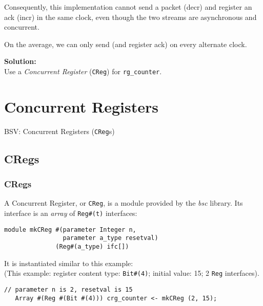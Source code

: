 \begin{frame}[fragile]
\begin{minipage}{0.4\textwidth}
{\scriptsize
Consequently, this implementation cannot send a packet (decr) and
register an ack (incr) in the same clock, even though the two streams
are asynchronous and concurrent.}

\vspace{1ex}

{\scriptsize
On the average, we can only send (and register ack) on every alternate clock.}

\vspace{2ex}

{\bf Solution:} \\
Use a \emph{Concurrent Register} ({\tt CReg}) for {\tt rg\_counter}.

\end{minipage}

\end{frame}


\section{Concurrent Registers}

\begin{frame}

\begin{center}
  {\LARGE BSV: Concurrent Registers ({\tt CReg}s)}
\end{center}

\end{frame}


\subsection{CRegs}

\begin{frame}[fragile]
\frametitle{CRegs}

\footnotesize

A Concurrent Register, or \verb|CReg|, is a module provided by
 the \emph{bsc} library.  Its interface is an \emph{array}
 of \verb|Reg#(t)| interfaces:

\begin{Verbatim}[frame=single]
module mkCReg #(parameter Integer n,
                parameter a_type resetval)
              (Reg#(a_type) ifc[])
\end{Verbatim}

\vspace{5ex}

It is instantiated similar to this example: \\
(This example: register content type: \verb|Bit#(4)|; initial value: 15; 2 {\tt Reg} interfaces).

\begin{Verbatim}[frame=single]
   // parameter n is 2, resetval is 15
   Array #(Reg #(Bit #(4))) crg_counter <- mkCReg (2, 15);
\end{Verbatim}

\end{frame}

